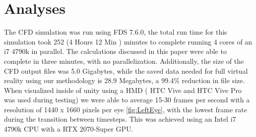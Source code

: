 \section{Analyses}

The CFD simulation was run using FDS 7.6.0, the total run time for this simulation took 252 (4 Hours 12 Min ) minutes to complete running 4 cores of an i7 4790k in parallel. The calculations discussed in this paper were able to complete in three minutes, with no parallelization.
Additionally, the size of the CFD output files was 5.0 Gigabytes, while the saved data needed for full virtual reality using our methodology is 28.9 Megabytes, a 99.4\% reduction in file size. When visualized inside of unity using a HMD ( HTC Vive and HTC Vive Pro was used during testing) we were able to average 15-30 frames per second with a resolution of 1440 x 1660 pixels per eye \ref{fig:LeftEye}, with the lowest frame rate during the transition between timesteps. This was achieved using an Intel i7 4790k CPU with a RTX 2070-Super GPU.


